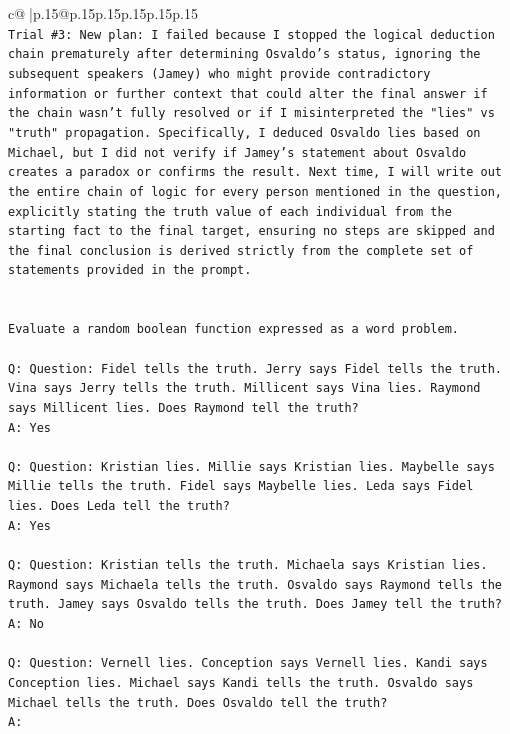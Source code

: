 \documentclass{article}
\begin{document}
{\begin{supertabular}{c@{$\;$}|p{.15\linewidth}@{}p{.15\linewidth}p{.15\linewidth}p{.15\linewidth}p{.15\linewidth}p{.15\linewidth}}
{{{\\ 
\texttt{Trial \#3: New plan: I failed because I stopped the logical deduction chain prematurely after determining Osvaldo's status, ignoring the subsequent speakers (Jamey) who might provide contradictory information or further context that could alter the final answer if the chain wasn't fully resolved or if I misinterpreted the "lies" vs "truth" propagation. Specifically, I deduced Osvaldo lies based on Michael, but I did not verify if Jamey's statement about Osvaldo creates a paradox or confirms the result. Next time, I will write out the entire chain of logic for every person mentioned in the question, explicitly stating the truth value of each individual from the starting fact to the final target, ensuring no steps are skipped and the final conclusion is derived strictly from the complete set of statements provided in the prompt.} \\
\\ 
\\ 
\texttt{Evaluate a random boolean function expressed as a word problem.} \\
\\ 
\texttt{Q: Question: Fidel tells the truth. Jerry says Fidel tells the truth. Vina says Jerry tells the truth. Millicent says Vina lies. Raymond says Millicent lies. Does Raymond tell the truth?} \\
\texttt{A: Yes} \\
\\ 
\texttt{Q: Question: Kristian lies. Millie says Kristian lies. Maybelle says Millie tells the truth. Fidel says Maybelle lies. Leda says Fidel lies. Does Leda tell the truth?} \\
\texttt{A: Yes} \\
\\ 
\texttt{Q: Question: Kristian tells the truth. Michaela says Kristian lies. Raymond says Michaela tells the truth. Osvaldo says Raymond tells the truth. Jamey says Osvaldo tells the truth. Does Jamey tell the truth?} \\
\texttt{A: No} \\
\\ 
\texttt{Q: Question: Vernell lies. Conception says Vernell lies. Kandi says Conception lies. Michael says Kandi tells the truth. Osvaldo says Michael tells the truth. Does Osvaldo tell the truth?} \\
\texttt{A:} \\
            }
        }
    }
     \\ \\


\end{supertabular}}
\end{document}
